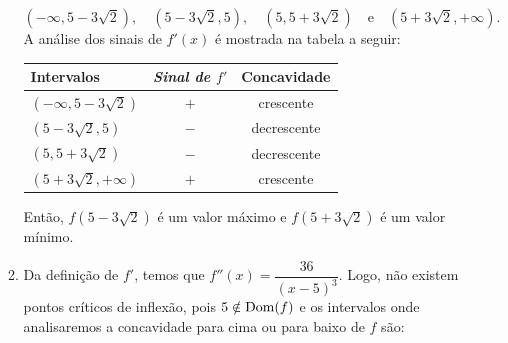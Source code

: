 \cleardoublepage\documentclass[../main.tex]{subfiles}
\begin{document}
\begin{ex}
\begin{enumerate}[a)]
\begin{solution}
\begin{enumerate}[1.]
\[ (-\infty,5-3\sqrt{2} ),\quad (5-3\sqrt{2},5),\quad (5,5+3\sqrt{2})\quad \mbox{e}\quad (5+3\sqrt{2}, +\infty ). \]
A análise dos sinais de \(f'(x)\) é mostrada na tabela a seguir:
\begin{center}
  \begin{tabular}{l|c|c}
  \toprule
    \textbf{Intervalos} &	\emph{Sinal de \(f'\)} &	\textbf{Concavidade}\\\hline
\((-\infty,5-3\sqrt{2} )\) &\(+\)& crescente\\\hline
  \((5-3\sqrt{2},5)\) & \(-\) & decrescente\\\hline
  \((5,5+3\sqrt{2})\) & \(-\) & decrescente\\\hline
  \((5+3\sqrt{2}, +\infty )\) & \(+\) & crescente\\
    \bottomrule
  \end{tabular}
  \end{center}
  Então, \(f(5-3\sqrt{2})\) é um valor máximo e \(f(5+3\sqrt{2})\) é um valor mínimo.
  \item Da definição de \(f'\), temos que \(f''(x)= \dfrac{36}{(x-5)^3}\).
Logo, não existem pontos críticos de inflexão, pois \(5 \notin {\rm Dom}(f)\) e os intervalos onde analisaremos a concavidade para cima ou para baixo de \(f\) são:


\end{enumerate}
\end{solution}
\end{enumerate}
\end{ex}
\end{document}
